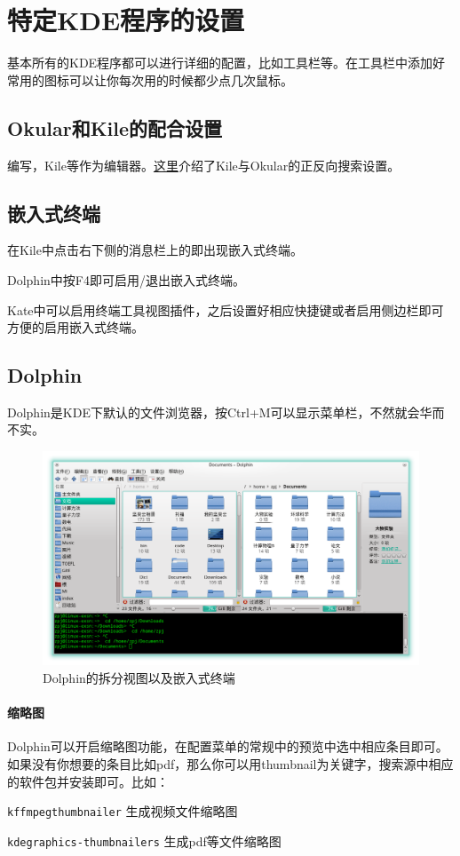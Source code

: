 \documentclass[11pt,openany]{book}
\newcommand{\soft}[1]{\texttt{\textcolor{dgreen}{#1}}}
\newcommand{\menu}[1]{\fbox{#1}}
\begin{document}
\section{特定KDE程序的设置}
基本所有的KDE程序都可以进行详细的配置，比如工具栏等。在工具栏中添加好常用的图标可以让你每次用的时候都少点几次鼠标。
\subsection{Okular和Kile的配合设置}
编写，Kile等作为编辑器。\href{http://zpj.blog.ustc.edu.cn/?p=338}{这里}介绍了Kile与Okular的正反向搜索设置。

\subsection{嵌入式终端}
在Kile中点击右下侧的消息栏上的\menu{Konsole}即出现嵌入式终端。

Dolphin中按F4即可启用/退出嵌入式终端。

Kate中可以启用终端工具视图插件，之后设置好相应快捷键或者启用侧边栏即可方便的启用嵌入式终端。
\subsection{Dolphin}
Dolphin是KDE下默认的文件浏览器，按Ctrl+M可以显示菜单栏，不然就会华而不实。
\begin{figure}[htbp!]
\centering
\includegraphics[width=\textwidth]{./pic/dolphin.png} 
\caption{Dolphin的拆分视图以及嵌入式终端}
\end{figure}

\paragraph{缩略图} Dolphin可以开启缩略图功能，在配置菜单的常规中的预览中选中相应条目即可。如果没有你想要的条目比如pdf，那么你可以用thumbnail为关键字，搜索源中相应的软件包并安装即可。比如：
\begin{compactenum}
 \item \soft{kffmpegthumbnailer} 生成视频文件缩略图
 \item \soft{kdegraphics-thumbnailers} 生成pdf等文件缩略图
\end{compactenum}
\end{document}
